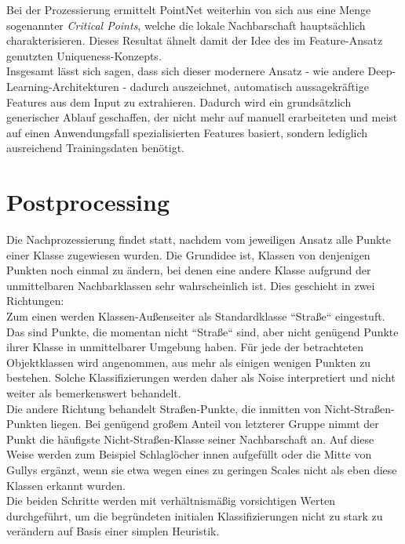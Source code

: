 Bei der Prozessierung ermittelt PointNet weiterhin von sich aus eine Menge sogenannter \textit{Critical Points}, welche die lokale Nachbarschaft hauptsächlich charakterisieren. Dieses Resultat ähnelt damit der Idee des im Feature-Ansatz genutzten Uniqueness-Konzepts. \\ 
Insgesamt lässt sich sagen, dass sich dieser modernere Ansatz - wie andere Deep-Learning-Architekturen - dadurch auszeichnet, automatisch aussagekräftige Features aus dem Input zu extrahieren. Dadurch wird ein grundsätzlich generischer Ablauf geschaffen, der nicht mehr auf manuell erarbeiteten und meist auf einen Anwendungsfall spezialisierten Features basiert, sondern lediglich ausreichend Trainingsdaten benötigt.

\section{Postprocessing}

Die Nachprozessierung findet statt, nachdem vom jeweiligen Ansatz alle Punkte einer Klasse zugewiesen wurden. Die Grundidee ist, Klassen von denjenigen Punkten noch einmal zu ändern, bei denen eine andere Klasse aufgrund der unmittelbaren Nachbarklassen sehr wahrscheinlich ist. Dies geschieht in zwei Richtungen: \\
Zum einen werden Klassen-Außenseiter als Standardklasse ``Straße`` eingestuft. Das sind Punkte, die momentan nicht ``Straße`` sind, aber nicht genügend Punkte ihrer Klasse in unmittelbarer Umgebung haben. Für jede der betrachteten Objektklassen wird angenommen, aus mehr als einigen wenigen Punkten zu bestehen. Solche Klassifizierungen werden daher als Noise interpretiert und nicht weiter als bemerkenswert behandelt. \\
Die andere Richtung behandelt Straßen-Punkte, die inmitten von Nicht-Straßen-Punkten liegen. Bei genügend großem Anteil von letzterer Gruppe nimmt der Punkt die häufigste Nicht-Straßen-Klasse seiner Nachbarschaft an. Auf diese Weise werden zum Beispiel Schlaglöcher innen aufgefüllt oder die Mitte von Gullys ergänzt, wenn sie etwa wegen eines zu geringen Scales nicht als eben diese Klassen erkannt wurden. \\
Die beiden Schritte werden mit verhältnismäßig vorsichtigen Werten durchgeführt, um die begründeten initialen Klassifizierungen nicht zu stark zu verändern auf Basis einer simplen Heuristik.